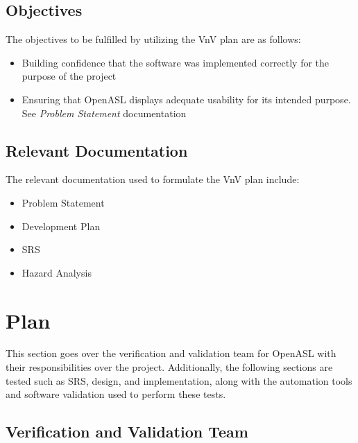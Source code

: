 \documentclass[12pt]{article}
\begin{document}
\subsection{Objectives}

The objectives to be fulfilled by utilizing the VnV plan are as follows:\\
\begin{itemize}
  \item Building confidence that the software was implemented correctly for the purpose of the project
  \item Ensuring that OpenASL displays adequate usability for its intended purpose. See \emph{Problem Statement} \citep{ProbState} documentation
\end{itemize}

\subsection{Relevant Documentation}

The relevant documentation used to formulate the VnV plan include:\\
\begin{itemize}
  \item Problem Statement \citep{ProbState}
  \item Development Plan \citep{DevPlan}
  \item SRS \citep{SRS}
  \item Hazard Analysis \citep{Hazard}
\end{itemize}

\section{Plan}
This section goes over the verification and validation team for OpenASL with their responsibilities over the project. Additionally, 
the following sections are tested such as SRS, design, and implementation, along with the automation tools and software validation used
to perform these tests. 

\subsection{Verification and Validation Team}
\end{document}
